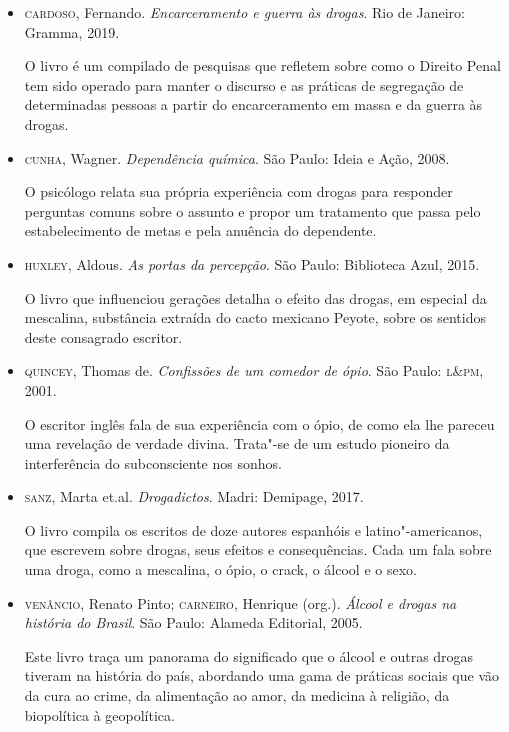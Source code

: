 \documentclass[12pt]{extarticle}
\begin{document}
\begin{itemize}
\item\textsc{cardoso}, Fernando. \textit{Encarceramento e guerra às drogas}. Rio de
Janeiro: Gramma, 2019.

O livro é um compilado de pesquisas que refletem sobre como o Direito
Penal tem sido operado para manter o discurso e as práticas de
segregação de determinadas pessoas a partir do encarceramento em massa e
da guerra às drogas.

\item\textsc{cunha}, Wagner. \textit{Dependência química}. São Paulo: Ideia e Ação,
2008.

O psicólogo relata sua própria experiência com drogas para responder
perguntas comuns sobre o assunto e propor um tratamento que passa pelo
estabelecimento de metas e pela anuência do dependente.

\item\textsc{huxley}, Aldous. \textit{As portas da percepção}. São Paulo: Biblioteca
Azul, 2015.

O livro que influenciou gerações detalha o efeito das drogas, em especial da mescalina, substância extraída do cacto mexicano Peyote, sobre os
sentidos deste consagrado escritor.

\item\textsc{quincey}, Thomas de. \textit{Confissões de um comedor de ópio}. São Paulo: \textsc{l\&pm}, 2001.

O escritor inglês fala de sua experiência com o ópio, de como ela lhe
pareceu uma revelação de verdade divina. Trata"-se de um estudo pioneiro
da interferência do subconsciente nos sonhos.

\item\textsc{sanz}, Marta et.al. \textit{Drogadictos}. Madri: Demipage, 2017.

O livro compila os escritos de doze autores espanhóis e
latino"-americanos, que escrevem sobre drogas, seus efeitos e
consequências. Cada um fala sobre uma droga, como a mescalina, o ópio, o
crack, o álcool e o sexo.

\item\textsc{venâncio}, Renato Pinto; \textsc{carneiro}, Henrique (org.). \textit{Álcool e drogas na história do Brasil}. São Paulo: Alameda Editorial, 2005.

Este livro traça um panorama do significado que o álcool e outras drogas
tiveram na história do país, abordando uma gama de práticas sociais que
vão da cura ao crime, da alimentação ao amor, da medicina à religião, da
biopolítica à geopolítica.
\end{itemize}
\end{document}
